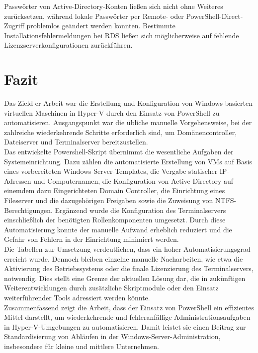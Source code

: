 \documentclass[a4paper,12pt]{article}
\begin{document}
Passwörter von Active-Directory-Konten lie\ss en sich nicht ohne Weiteres zurücksetzen, während lokale Passwörter per Remote- oder PowerShell-Direct-Zugriff problemlos geändert werden konnten. Bestimmte Installationsfehlermeldungen bei RDS lie\ss en sich möglicherweise auf fehlende Lizenzserverkonfigurationen zurückführen.\\

\newpage

\section{Fazit}

Das Zield er Arbeit war die Erstellung und Konfiguration von Windows-basierten virtuellen Maschinen in Hyper-V durch den Einsatz von PowerShell zu automatisieren.
Ausgangspunkt war die übliche manuelle Vorgehensweise, bei der zahlreiche wiederkehrende Schritte erforderlich sind, um Domänencontroller, Dateiserver und Terminalserver bereitzustellen.\\

Das entwickelte Powershell-Skript übernimmt die wesentliche Aufgaben der Systemeinrichtung. 
Dazu zählen die automatisierte Erstellung von VMs auf Basis eines vorbereiteten Windows-Server-Templates, die Vergabe statischer IP-Adressen und Computernamen, die Konfiguration von Active Directory auf einemdem dazu Eingerichteten Domain Controller, die Einrichtung eines Fileserver und die dazugehörigen Freigaben sowie die Zuweisung von NTFS-Berechtigungen. 
Ergänzend wurde die Konfiguration des Terminalservers einschlie\ss lich der benötigten Rollenkomponenten umgesetzt. 
Durch diese Automatisierung konnte der manuelle Aufwand erheblich reduziert und die Gefahr von Fehlern in der Einrichtung minimiert werden.\\

Die Tabellen zur Umsetzung verdeutlichen, dass ein hoher Automatisierungsgrad erreicht wurde.
Dennoch bleiben einzelne manuelle Nacharbeiten, wie etwa die Aktivierung des Betriebssystems oder die finale Lizenzierung des Terminalservers, notwendig.
Dies stellt eine Grenze der aktuellen Lösung dar, die in zukünftigen Weiterentwicklungen durch zusätzliche Skriptmodule oder den Einsatz weiterführender Tools adressiert werden könnte.\\

Zusammenfassend zeigt die Arbeit, dass der Einsatz von PowerShell ein effizientes Mittel darstellt, um wiederkehrende und fehleranfällige Administrationsaufgaben in Hyper-V-Umgebungen zu automatisieren. 
Damit leistet sie einen Beitrag zur Standardisierung von Abläufen in der Windows-Server-Administration, insbesondere für kleine und mittlere Unternehmen.\\
\end{document}

